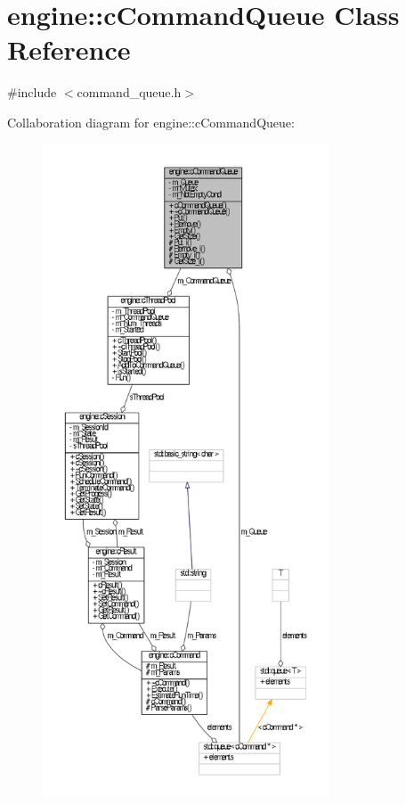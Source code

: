\hypertarget{classengine_1_1cCommandQueue}{\section{engine\-:\-:c\-Command\-Queue \-Class \-Reference}
\label{classengine_1_1cCommandQueue}
}


{\ttfamily \#include $<$command\-\_\-queue.\-h$>$}



\-Collaboration diagram for engine\-:\-:c\-Command\-Queue\-:\nopagebreak
\begin{figure}[H]
\begin{center}
\leavevmode
\includegraphics[height=550pt]{classengine_1_1cCommandQueue__coll__graph}
\end{center}
\end{figure}
